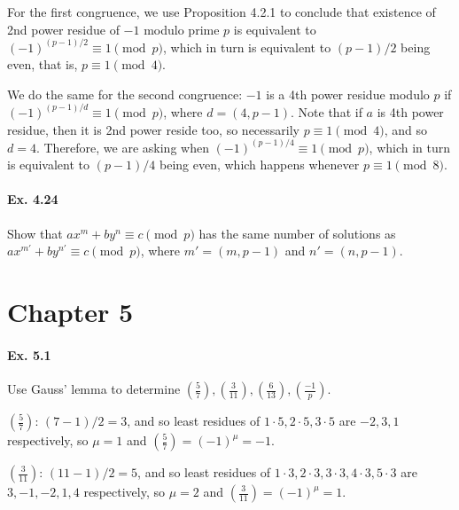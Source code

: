 \documentclass[notitlepage]{article}
\theoremstyle{definition}
\begin{document}
For the first congruence, we use Proposition 4.2.1 to conclude that
existence of 2nd power residue of $-1$ modulo prime $p$ is equivalent
to $(-1)^{(p-1)/2} \equiv 1 \pmod p$, which in turn is equivalent to
$(p-1)/2$ being even, that is, $p \equiv 1 \pmod 4$.

We do the same for the second congruence: $-1$ is a 4th power residue
modulo $p$ if $(-1)^{(p-1)/d} \equiv 1 \pmod p$, where $d = (4,
p-1)$. Note that if $a$ is 4th power residue, then it is 2nd power
reside too, so necessarily $p \equiv 1 \pmod 4$, and so $d =
4$. Therefore, we are asking when $(-1)^{(p-1)/4} \equiv 1 \pmod p$,
which in turn is equivalent to $(p-1)/4$ being even, which happens
whenever $p \equiv 1 \pmod 8$.

\paragraph{Ex. 4.24}
Show that $a x^m + b y^n \equiv c \pmod p$ has the same number of
solutions as $a x^{m'} + b y^{n'} \equiv c \pmod p$, where $m' =
(m,p-1)$ and $n' = (n, p-1)$.



\section{Chapter 5}

\paragraph{Ex. 5.1}
Use Gauss' lemma to determine $\left(\frac{5}{7}\right),
\left(\frac{3}{11}\right), \left(\frac{6}{13}\right),
\left(\frac{-1}{p}\right)$.

$\left(\frac{5}{7}\right)$: $(7-1)/2 = 3$, and so least residues of $1
\cdot 5, 2 \cdot 5, 3 \cdot 5$ are $-2, 3, 1$ respectively, so $\mu =
1$ and $\left(\frac{5}{7}\right) = (-1)^\mu = -1$.

$\left(\frac{3}{11}\right)$: $(11-1)/2 = 5$, and so least residues of
$1 \cdot 3, 2 \cdot 3, 3 \cdot 3, 4 \cdot 3, 5 \cdot 3$ are $3, -1,
-2, 1, 4$ respectively, so $\mu = 2$ and $\left(\frac{3}{11}\right) =
(-1)^\mu = 1$.
\end{document}
